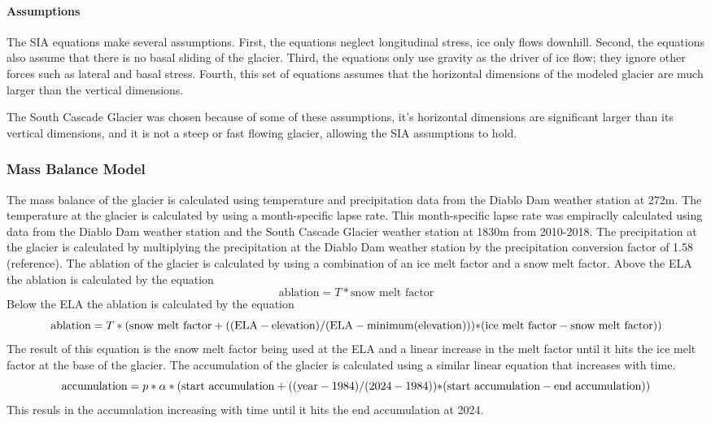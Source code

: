 \documentclass{article}
\begin{document}
\paragraph{Assumptions}

The SIA equations make several assumptions. First, the equations neglect longitudinal stress, ice only flows downhill. Second, the equations 
also assume that there is no basal sliding of the glacier. Third, the equations only use gravity as the driver of ice flow; they ignore other 
forces such as lateral and basal stress. Fourth, this set of equations assumes that the horizontal dimensions of the modeled glacier are much 
larger than the vertical dimensions.

The South Cascade Glacier was chosen because of some of these assumptions, it's horizontal dimensions are significant larger than its vertical 
dimensions, and it is not a steep or fast flowing glacier, allowing the SIA assumptions to hold.

\subsubsection{Mass Balance Model}
The mass balance of the glacier is calculated using temperature and precipitation data from the Diablo Dam weather station at 272m. The 
temperature at the glacier is calculated by using a month-specific lapse rate. This month-specific lapse rate was empiraclly calculated using
data from the Diablo Dam weather station and the South Cascade Glacier weather station at 1830m from 2010-2018. The precipitation at the 
glacier is calculated by multiplying the precipitation at the Diablo Dam weather station by the precipitation conversion factor of 1.58 
(reference). The ablation of the glacier is calculated by using a combination of an ice melt factor and a snow melt factor. Above the ELA the 
ablation is calculated by the equation
\begin{equation}\text{ablation}=T*\text{snow melt factor}\end{equation}
Below the ELA the ablation is calculated by the equation
\begin{equation}\text{ablation}=T*(\text{snow melt factor}+((\text{ELA}-\text{elevation})/(\text{ELA}-\text{minimum(elevation)}))*$$
$$(\text{ice melt factor}-\text{snow melt factor}))\end{equation}
The result of this equation is the snow melt factor being used at the ELA and a linear increase in the melt factor until it hits the ice melt 
factor at the base of the glacier. 
The accumulation of the glacier is calculated using a similar linear equation that increases with time.
\begin{equation}\text{accumulation}=p*\alpha*(\text{start accumulation}+((\text{year}-1984)/(2024-1984))*$$
$$(\text{start accumulation}-\text{end accumulation}))\end{equation}
This resuls in the accumulation increasing with time until it hits the end accumulation at 2024. 
\end{document}
